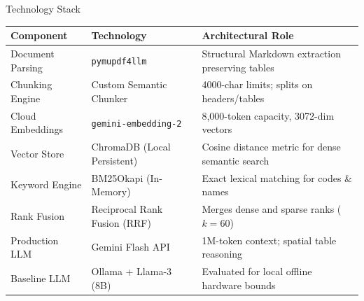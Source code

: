 \documentclass[11pt]{beamer}
\begin{document}
\begin{frame}{Technology Stack}
    \begin{table}[h]
    \centering
    \small
    \begin{tabular}{@{}p{2.6cm}p{3.6cm}p{4.2cm}@{}}
        \toprule
        \textbf{Component} & \textbf{Technology} & \textbf{Architectural Role}\\
        \midrule
        Document Parsing & \texttt{pymupdf4llm} & Structural Markdown extraction preserving tables\\[3pt]
        Chunking Engine & Custom Semantic Chunker & 4000-char limits; splits on headers/tables\\[3pt]
        Cloud Embeddings & \texttt{gemini-embedding-2} & 8,000-token capacity, 3072-dim vectors\\[3pt]
        Vector Store & ChromaDB (Local Persistent) & Cosine distance metric for dense semantic search\\[3pt]
        Keyword Engine & BM25Okapi (In-Memory) & Exact lexical matching for codes \& names\\[3pt]
        Rank Fusion & Reciprocal Rank Fusion (RRF) & Merges dense and sparse ranks ($k=60$)\\[3pt]
        Production LLM & Gemini Flash API & 1M-token context; spatial table reasoning\\[3pt]
        Baseline LLM & Ollama + Llama-3 (8B) & Evaluated for local offline hardware bounds\\
        \bottomrule
    \end{tabular}
    \end{table}
\end{frame}

\end{document}
